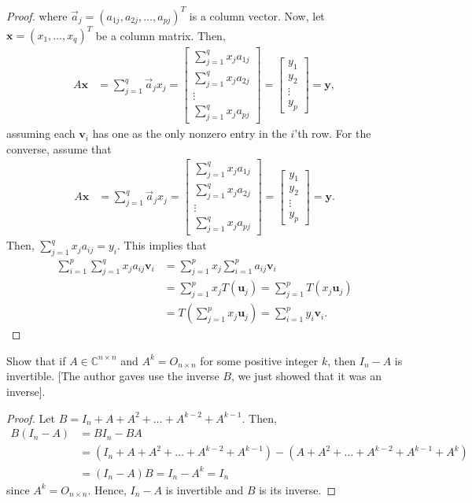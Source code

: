 \documentclass[12pt]{article}
\newenvironment{problem}[2][Problem]{\begin{trivlist} \item[\hskip \labelsep {\bfseries #1}\hskip \labelsep {\bfseries #2.}]}{\end{trivlist}}
\begin{document}
\begin{proof}
where $\vec{a}_{j} = (a_{1j},a_{2j},\dots,a_{pj})^{T}$ is a column vector.
Now, let $\mathbf{x} = (x_{1},\dots,x_{q})^{T}$ be a column matrix. Then,
\begin{align*}
  A\mathbf{x} &= \sum_{j=1}^{q} \vec{a}_{j}x_{j} =    
\begin{bmatrix}
  \sum_{j=1}^{q}x_{j}a_{1j} \\ \sum_{j=1}^{q}x_{j}a_{2j} \\ \vdots \\ \sum_{j=1}^{q}x_{j}a_{pj}
\end{bmatrix}
=
\begin{bmatrix}
  y_{1} \\ y_{2} \\ \vdots \\ y_{p}
\end{bmatrix}
= \mathbf{y},
\end{align*}
assuming each $\mathbf{v}_{i}$ has one as the only nonzero entry in the $i$'th row. For the converse, assume that  
\begin{align*}
  A\mathbf{x} &= \sum_{j=1}^{q} \vec{a}_{j}x_{j} =    
\begin{bmatrix}
  \sum_{j=1}^{q}x_{j}a_{1j} \\ \sum_{j=1}^{q}x_{j}a_{2j} \\ \vdots \\ \sum_{j=1}^{q}x_{j}a_{pj}
\end{bmatrix}
=
\begin{bmatrix}
  y_{1} \\ y_{2} \\ \vdots \\ y_{p}
\end{bmatrix}
= \mathbf{y}.
\end{align*}
Then, $\sum_{j=1}^{q} x_{j}a_{ij} = y_{i}$. This implies that 
\begin{align*}
  \sum_{i=1}^{p}\sum_{j=1}^{q} x_{j}a_{ij} \mathbf{v}_{i} &=  \sum_{j=1}^{p}x_{j}\sum_{i=1}^{p} a_{ij}\mathbf{v}_{i} \\
  &= \sum_{j=1}^{p} x_{j}T(\mathbf{u}_{j}) = \sum_{j=1}^{p}T(x_{j}\mathbf{u}_{j})\\
  &= T\left( \sum_{j=1}^{p} x_{j}\mathbf{u}_{j} \right) = \sum_{i=1}^{p} y_{i} \mathbf{v}_{i}.
\end{align*}
\end{proof}
\begin{problem}{1.21}
  Show that if $A\in \mathbb{C}^{n\times n}$ and $A^{k}=O_{n\times n}$ for some positive integer $k$, then $I_{n}-A$ is invertible. [The author gaves use the inverse $B$, we just showed that it was an inverse]. 
\begin{proof}
  Let $B=I_{n}+A+A^{2}+\dots+A^{k-2}+A^{k-1}$. Then, 
\begin{align*}
  B(I_{n}-A) &= BI_{n}-BA\\
  &= \left( I_{n}+A+A^{2}+\dots+A^{k-2}+A^{k-1} \right) - \left( A+A^{2}+\dots+A^{k-2}+A^{k-1}+A^{k} \right)\\
  &= (I_{n}-A)B = I_{n} - A^{k} = I_{n}
\end{align*}
since $A^{k}=O_{n\times n}$. Hence, $I_{n}-A$ is invertible and $B$ is its inverse.
\end{proof}
\end{problem}
\end{document}

